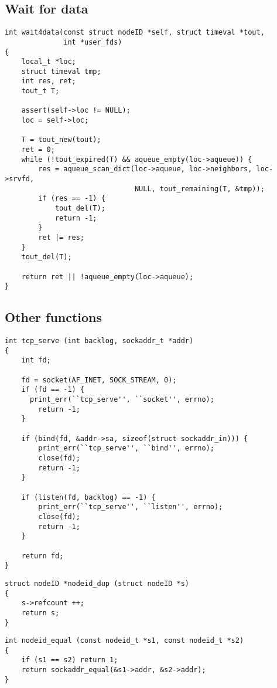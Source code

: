 \subsection{Wait for data}
\label{nh-wait4data}
\begin{lstlisting}
int wait4data(const struct nodeID *self, struct timeval *tout,
              int *user_fds)
{
    local_t *loc;
    struct timeval tmp;
    int res, ret;
    tout_t T;

    assert(self->loc != NULL);
    loc = self->loc;

    T = tout_new(tout);
    ret = 0;
    while (!tout_expired(T) && aqueue_empty(loc->aqueue)) {
        res = aqueue_scan_dict(loc->aqueue, loc->neighbors, loc->srvfd,
                               NULL, tout_remaining(T, &tmp));
        if (res == -1) {
            tout_del(T);
            return -1;
        }
        ret |= res;
    }
    tout_del(T);

    return ret || !aqueue_empty(loc->aqueue);
}
\end{lstlisting}


\subsection{Other functions}
\label{nh-oth-func}
\begin{lstlisting}
int tcp_serve (int backlog, sockaddr_t *addr)
{
    int fd;

    fd = socket(AF_INET, SOCK_STREAM, 0);
    if (fd == -1) {
      print_err(``tcp_serve'', ``socket'', errno);
        return -1;
    }

    if (bind(fd, &addr->sa, sizeof(struct sockaddr_in))) {
        print_err(``tcp_serve'', ``bind'', errno);
        close(fd);
        return -1;
    }

    if (listen(fd, backlog) == -1) {
        print_err(``tcp_serve'', ``listen'', errno);
        close(fd);
        return -1;
    }

    return fd;
}
\end{lstlisting}

\begin{lstlisting}
struct nodeID *nodeid_dup (struct nodeID *s)
{
    s->refcount ++;
    return s;
}
\end{lstlisting}

\begin{lstlisting}
int nodeid_equal (const nodeid_t *s1, const nodeid_t *s2)
{
    if (s1 == s2) return 1;
    return sockaddr_equal(&s1->addr, &s2->addr);
}
\end{lstlisting}

